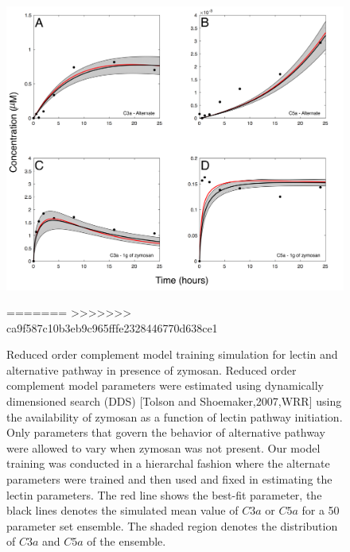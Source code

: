 \documentclass[12pt]{article}
\begin{document}
\begin{figure}[h]
\centering
\includegraphics[width=1.0\textwidth]{./Figures/Figure2_Fit.pdf}
\caption{Reduced order complement model training simulation for lectin and alternative pathway in presence of zymosan. Reduced order complement model parameters were estimated using dynamically dimensioned search (DDS) [Tolson and Shoemaker,2007,WRR] using the availability of zymosan as a function of lectin pathway initiation.  Only parameters that govern the behavior of alternative pathway were allowed to vary when zymosan was not present. Our model training was conducted in a hierarchal fashion where the alternate parameters were trained and then used and fixed in estimating the lectin parameters. The red line shows the best-fit parameter, the black lines denotes the simulated mean value of $C3a$ or $C5a$ for a 50 parameter set ensemble. The shaded region denotes the distribution of $C3a$ and $C5a$ of the ensemble.}
\label{fig-fit}
=======
>>>>>>> ca9f587c10b3eb9c965fffe2328446770d638ce1
\end{figure}
\end{document}
